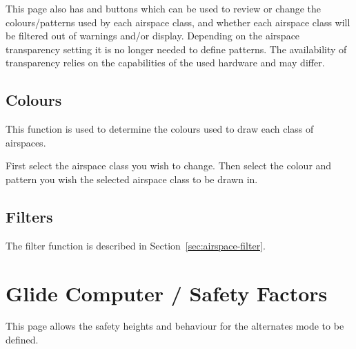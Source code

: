 This page also has  and  buttons which
can be used to review or change the colours/patterns used by each
airspace class, and whether each airspace class will be filtered out
of warnings and/or display. Depending on the airspace transparency setting it is 
no longer needed to define patterns. The availability of transparency relies 
on the capabilities of the used hardware and may differ. 

\subsection*{Colours}
This function is used to determine the colours used to draw each class of
airspaces.

First select the airspace class you wish to change. Then select the colour and 
pattern you wish the selected airspace class to be drawn in.

\subsection*{Filters}
The filter function is described in Section~\ref{sec:airspace-filter}.


\section{Glide Computer / Safety Factors}

This page allows the safety heights and behaviour for the alternates mode to be defined.

